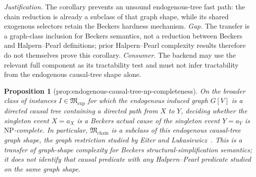 \documentclass{article}
\newtheorem{proposition}{Proposition}
\begin{document}
\par\smallskip\noindent \textit{Justification.} The corollary prevents an unsound endogenous-tree fast path: the chain reduction is already a subclass of that graph shape, while its shared exogenous selectors retain the Beckers hardness mechanism. \textit{Gap.} The transfer is a graph-class inclusion for Beckers semantics, not a reduction between Beckers and Halpern--Pearl definitions; prior Halpern--Pearl complexity results therefore do not themselves prove this corollary. \textit{Consumer.} The backend may use the relevant full component as its tractability test and must not infer tractability from the endogenous causal-tree shape alone.

\begin{proposition}[prop:endogenous-causal-tree-np-completeness]\label{prop:endogenous-causal-tree-np-completeness}
On the broader class of instances \(I\in\mathfrak M_{\mathrm{exp}}\) for which the endogenous induced graph \(G[V]\) is a directed causal tree containing a directed path from \(X\) to \(Y\), deciding whether the singleton event \(X=a_X\) is a Beckers actual cause of the singleton event \(Y=a_Y\) is \(\mathrm{NP}\)-complete.  In particular, \(\mathfrak M_{\mathrm{chain}}\) is a subclass of this endogenous causal-tree graph shape, the graph restriction studied by Eiter and Lukasiewicz~\cite{EiterLukasiewicz2006Tractable}.  This is a transfer of graph-shape complexity for Beckers structural-simplification semantics; it does not identify that causal predicate with any Halpern--Pearl predicate studied on the same graph shape.
\end{proposition}
\end{document}

